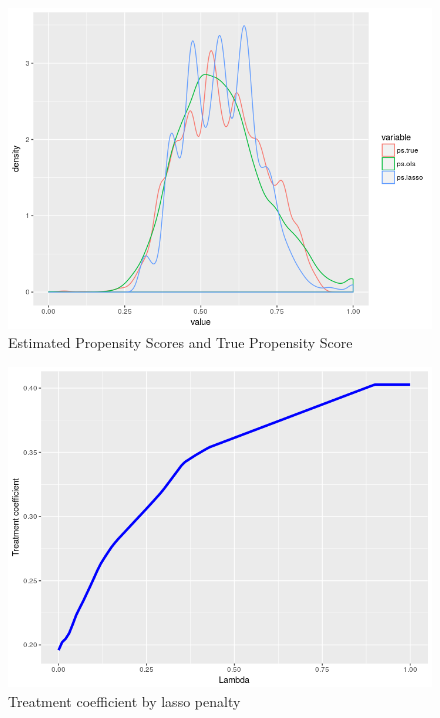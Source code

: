 \documentclass{article}
\begin{document}
\begin{figure}
\center
\caption{Estimated Propensity Scores and True Propensity Score}
\label{pscores}
\includegraphics[scale=1]{pscore_ests.png}
\end{figure}

\begin{figure}
\center
\caption{Treatment coefficient by lasso penalty}
\label{lassotreat}
\includegraphics[scale=1]{treat_coef_lasso.png}
\end{figure}
\end{document}
